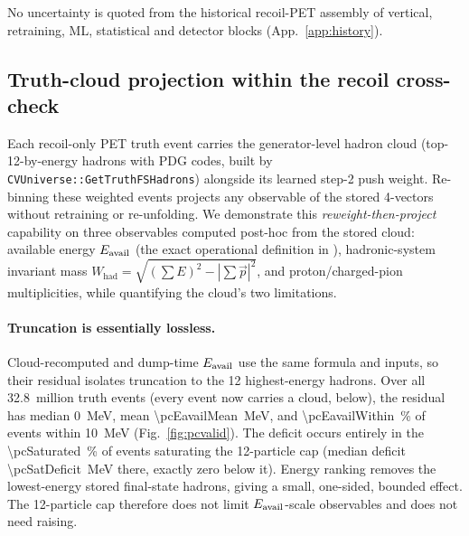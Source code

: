 No uncertainty is quoted from the historical recoil-PET assembly of vertical, retraining, ML, statistical and detector blocks (App.~\ref{app:history}).

\subsection{Truth-cloud projection within the recoil cross-check}
\label{sec:pet-projection}

Each recoil-only PET truth event carries the generator-level hadron cloud (top-12-by-energy hadrons with PDG codes, built by \texttt{CVUniverse::GetTruthFSHadrons}) alongside its learned step-2 push weight. Re-binning these weighted events projects any observable of the stored 4-vectors without retraining or re-unfolding. We demonstrate this \emph{reweight-then-project} capability on three observables computed post-hoc from the stored cloud: available energy $E_{\mathrm{avail}}$ (the exact operational definition in ), hadronic-system invariant mass $W_{\text{had}}=\sqrt{(\sum E)^2-|\sum\vec p|^2}$, and proton/charged-pion multiplicities, while quantifying the cloud's two limitations.

\paragraph{Truncation is essentially lossless.} Cloud-recomputed and dump-time $E_{\mathrm{avail}}$ use the same formula and inputs, so their residual isolates truncation to the 12 highest-energy hadrons. Over all \num{32.8}~million truth events (every event now carries a cloud, below), the residual has median \SI{0}{MeV}, mean \SI{\pcEavailMean}{MeV}, and \SI{\pcEavailWithin}{\percent} of events within \SI{10}{MeV} (Fig.~\ref{fig:pcvalid}). The deficit occurs entirely in the \SI{\pcSaturated}{\percent} of events saturating the 12-particle cap (median deficit \SI{\pcSatDeficit}{MeV} there, exactly zero below it). Energy ranking removes the lowest-energy stored final-state hadrons, giving a small, one-sided, bounded effect. The 12-particle cap therefore does not limit $E_{\mathrm{avail}}$-scale observables and does not need raising.

